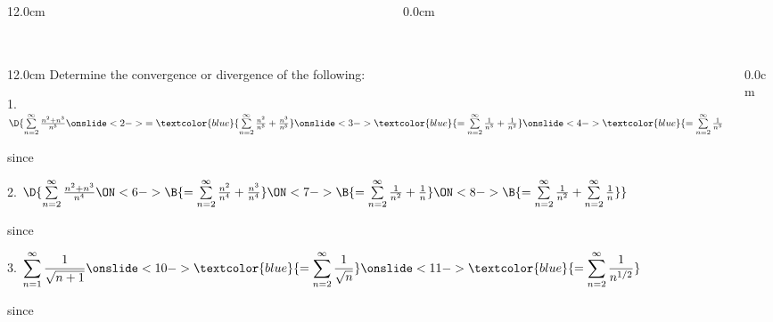 \begin{frame}
\begin{columns}
\begin{column}{12.0cm}
\end{column}
\begin{column}{0.0cm}\end{column}
\end{columns}
\end{frame}

\begin{frame}
\frametitle{}
\scriptsize

\vspace{0.2cm}

\begin{columns}
\begin{column}{12.0cm}
Determine the convergence or divergence of the following:\\
\vspace{0.2cm}

1. \quad$\D{\sum \limits_{n=2}^{\infty} \frac{n^2 + n^3}{n^5}  \onslide<2->{= \textcolor{blue}{\sum \limits_{n=2}^{\infty} \frac{n^2}{n^5} + \frac{n^3}{n^5}}} \onslide<3->{\textcolor{blue}{= \sum \limits_{n=2}^{\infty} \frac{1}{n^3} + \frac{1}{n^2}}} \onslide<4->{\textcolor{blue}{= \sum \limits_{n=2}^{\infty} \frac{1}{n^3} + \sum \limits_{n=2}^{\infty} \frac{1}{n^2}}}}$

\vspace{0.5cm}

since 

\vspace{0.9cm}

2. \quad$\D{\sum \limits_{n=2}^{\infty} \frac{n^2 + n^3}{n^{4}} 
\ON<6->{\B{= \sum \limits_{n=2}^{\infty} \frac{n^2}{n^4} + \frac{n^3}{n^4}} 
\ON<7->{\B{= \sum \limits_{n=2}^{\infty} \frac{1}{n^2} + \frac{1}{n}}} 
\ON<8->{\B{= \sum \limits_{n=2}^{\infty} \frac{1}{n^2} + \sum \limits_{n=2}^{\infty} \frac{1}{n}}}}}$

\vspace{0.5cm}

since 

\vspace{0.9cm}

3. \quad$\displaystyle{\sum \limits_{n=1}^{\infty} \frac{1}{\sqrt{n+1}} \onslide<10->{\textcolor{blue}{= \sum \limits_{n=2}^{\infty} \frac{1}{\sqrt{n}}}} \onslide<11->{\textcolor{blue}{= \sum \limits_{n=2}^{\infty} \frac{1}{n^{1/2}}}}}$

\vspace{0.5cm}

since 

\vspace{4.5cm}

\end{column}
\begin{column}{0.0cm}
	
\end{column}
\end{columns}
\end{frame}

